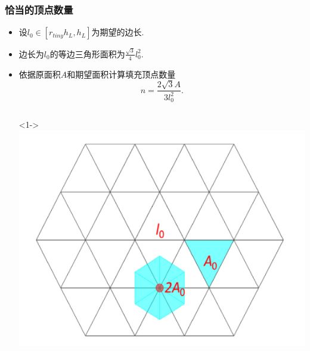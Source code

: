 \documentclass[UTF8]{ctexbeamer}	%
\theoremstyle{plain}
\theoremstyle{definition}
\theoremstyle{remark}
\numberwithin{equation}{section}
\begin{document}
\begin{frame}
    \frametitle{恰当的顶点数量}
        \begin{itemize}
            \item 设$l_0 \in [r_{tiny}h_L, h_L]$为期望的边长.
            \item 边长为$l_0$的等边三角形面积为$\frac{\sqrt{3}}{4} l_0^2$.
            \item 依据原面积$A$和期望面积计算填充顶点数量
            \[n = \frac{2 \sqrt{3} A}{3 l_0^2}. \]
            \begin{columns}
                <1->
                \includegraphics[width = \textwidth]{fig/nodeNumber.png}
             \end{columns}
        \end{itemize}
\end{frame}
\end{document}
